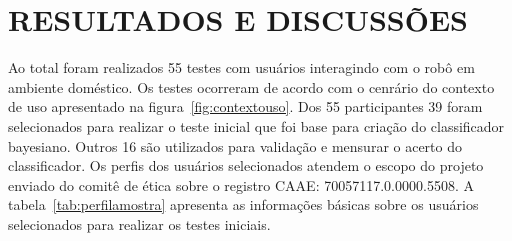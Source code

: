 \chapter{RESULTADOS E DISCUSSÕES}
\label{cap:resultados}
Ao total foram realizados 55 testes com usuários interagindo com o robô em ambiente doméstico. Os testes ocorreram de acordo com o cenrário do contexto de uso apresentado na figura~\ref{fig:contextouso}. Dos 55 participantes 39 foram selecionados para realizar o teste inicial que foi base para criação do classificador bayesiano. Outros 16 são utilizados para validação e mensurar o acerto do classificador. Os perfis dos usuários selecionados atendem o escopo do projeto enviado do comitê de ética sobre o registro CAAE: 70057117.0.0000.5508. A tabela~\ref{tab:perfilamostra} apresenta as informações básicas sobre os usuários selecionados para realizar os testes iniciais.

